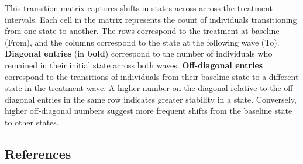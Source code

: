 \documentclass[
  single column]{article}
\begin{document}
This transition matrix captures shifts in states across across the
treatment intervals. Each cell in the matrix represents the count of
individuals transitioning from one state to another. The rows correspond
to the treatment at baseline (From), and the columns correspond to the
state at the following wave (To). \textbf{Diagonal entries} (in
\textbf{bold}) correspond to the number of individuals who remained in
their initial state across both waves. \textbf{Off-diagonal entries}
correspond to the transitions of individuals from their baseline state
to a different state in the treatment wave. A higher number on the
diagonal relative to the off-diagonal entries in the same row indicates
greater stability in a state. Conversely, higher off-diagonal numbers
suggest more frequent shifts from the baseline state to other states.

\newpage{}

\subsection*{References}\label{references}
\end{document}
